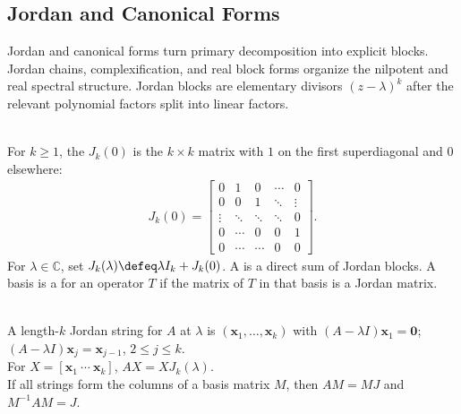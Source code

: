 \subsection{Jordan and Canonical Forms}


%

Jordan and canonical forms turn primary decomposition into explicit blocks. Jordan chains, complexification, and real block forms organize the nilpotent and real spectral structure. Jordan blocks are elementary divisors $(z-\lambda)^k$ after the relevant polynomial factors split into linear factors.

\begin{definition} \label{def:jordan-chain-block-and-matrix} \\
For $k\geq1$, the  $J_k(0)$ is the $k\times k$ matrix with $1$ on the first superdiagonal and $0$ elsewhere:
\begin{align}
J_k(0)=
\begin{bmatrix}
0&1&0&\cdots&0\\
0&0&1&\ddots&\vdots\\
\vdots&\ddots&\ddots&\ddots&0\\
0&\cdots&0&0&1\\
0&\cdots&\cdots&0&0
\end{bmatrix}.
\nonumber
\end{align}
For $\lambda\in\mathbb{C}$, set $J_k(\lambda)\defeq\lambda I_k+J_k(0)$. A  is a direct sum of Jordan blocks. A basis is a  for an operator $T$ if the matrix of $T$ in that basis is a Jordan matrix.
\end{definition}

\begin{perspective} \label{per:jordan-strings-as-columns} \\
A length-$k$ Jordan string for $A$ at $\lambda$ is $(\mathbf{x}_1,\ldots,\mathbf{x}_k)$ with $(A-\lambda I)\mathbf{x}_1=\mathbf{0}$; $(A-\lambda I)\mathbf{x}_j=\mathbf{x}_{j-1}$, $2\leq j\leq k$.\\
For $X=[\mathbf{x}_1\ \cdots\ \mathbf{x}_k]$, $AX=XJ_k(\lambda)$.\\
If all strings form the columns of a basis matrix $M$, then $AM=MJ$ and $M^{-1}AM=J$.
\end{perspective}

